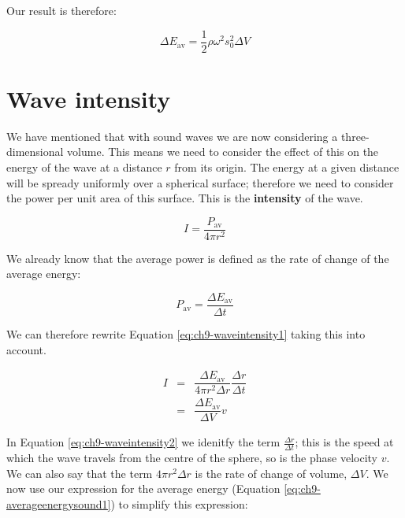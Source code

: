 \documentclass[
]{book}
\begin{document}
Our result is therefore:

\begin{equation}
\Delta E_{\mathrm{av}} = \frac{1}{2}\rho \omega^2 s_0^2 \Delta V
\label{eq:ch9-averageenergysound1}
\end{equation}

\hypertarget{sec:ch9-waveintensity}{%
\section{Wave intensity}\label{sec:ch9-waveintensity}}

We have mentioned that with sound waves we are now considering a three-dimensional volume. This means we need to consider the effect of this on the energy of the wave at a distance \(r\) from its origin. The energy at a given distance will be spready uniformly over a spherical surface; therefore we need to consider the power per unit area of this surface. This is the \textbf{intensity} of the wave.

\begin{equation}
I = \frac{P_\text{av}}{4\pi r^2}
\label{eq:ch9-waveintensity1}
\end{equation}

We already know that the average power is defined as the rate of change of the average energy:

\begin{equation}
P_\text{av} = \frac{\Delta E_\text{av}}{\Delta t}
\end{equation}

We can therefore rewrite Equation \eqref{eq:ch9-waveintensity1} taking this into account.

\begin{equation}
\begin{array}{rcl}
I & = &  \dfrac{\Delta E_\text{av}}{4\pi r^2 \Delta r} \dfrac{\Delta r}{\Delta t} \\
 &=& \dfrac{\Delta E_\text{av}}{\Delta V} v
\end{array}
\label{eq:ch9-waveintensity2}
\end{equation}

In Equation \eqref{eq:ch9-waveintensity2} we idenitfy the term \(\frac{\Delta r}{\Delta t}\); this is the speed at which the wave travels from the centre of the sphere, so is the phase velocity \(v\). We can also say that the term \(4 \pi r^2 \Delta r\) is the rate of change of volume, \(\Delta V\). We now use our expression for the average energy (Equation \eqref{eq:ch9-averageenergysound1}) to simplify this expression:
\end{document}
